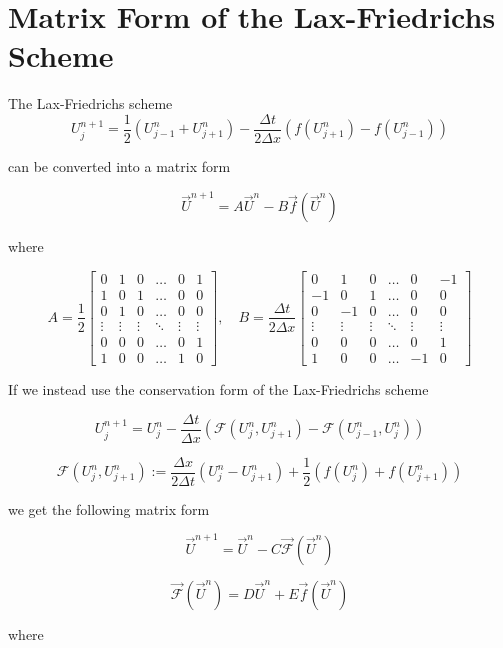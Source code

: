 \documentclass{myproject}
\begin{document}
\section{Matrix Form of the Lax-Friedrichs Scheme}
The Lax-Friedrichs scheme
\[
    U_j^{n+1} = \frac{1}{2}\left( U_{j-1}^{n} + U_{j+1}^{n} \right) - \frac{\Delta t}{2\Delta x}\left( f(U_{j+1}^{n}) - f(U_{j-1}^{n}) \right)
\]

can be converted into a matrix form

\[
\vec{U}^{n+1} = A\vec{U}^{n} - B\vec{f}(\vec{U}^{n})
\]

where

\[
A = \frac{1}{2}
\begin{bmatrix}
0 & 1 & 0 & \dots & 0 & 1 \\
1 & 0 & 1 & \dots & 0 & 0 \\
0 & 1 & 0 & \dots & 0 & 0 \\
\vdots & \vdots & \vdots & \ddots & \vdots & \vdots \\
0 & 0 & 0 & \dots & 0 & 1 \\
1 & 0 & 0 & \dots & 1 & 0
\end{bmatrix},
\quad
B = \frac{\Delta t}{2 \Delta x}
\begin{bmatrix}
0 & 1 & 0 & \dots & 0 & -1 \\
-1 & 0 & 1 & \dots & 0 & 0 \\
0 & -1 & 0 & \dots & 0 & 0 \\
\vdots & \vdots & \vdots & \ddots & \vdots & \vdots \\
0 & 0 & 0 & \dots & 0 & 1 \\
1 & 0 & 0 & \dots & -1 & 0
\end{bmatrix}
\]

If we instead use the conservation form of the Lax-Friedrichs scheme

\[
    U_j^{n+1} = U_j^n - \frac{\Delta t}{\Delta x} \left( \mathcal{F}(U_{j}^{n}, U_{j+1}^{n}) - \mathcal{F}(U_{j-1}^{n}, U_{j}^{n}) \right)
\]

\[
    \mathcal{F}(U_j^n, U_{j+1}^n) := \frac{\Delta x}{2 \Delta t}(U_j^n - U_{j+1}^n) + \frac{1}{2}\left( f(U_j^n) + f(U_{j+1}^n) \right)
\]

we get the following matrix form

\[
\vec{U}^{n+1} = \vec{U}^{n} - C\vec{\mathcal{F}}(\vec{U}^{n})
\]

\[
\vec{\mathcal{F}}(\vec{U}^{n}) = D\vec{U}^{n} + E\vec{f}(\vec{U}^{n})
\]

where
\end{document}
